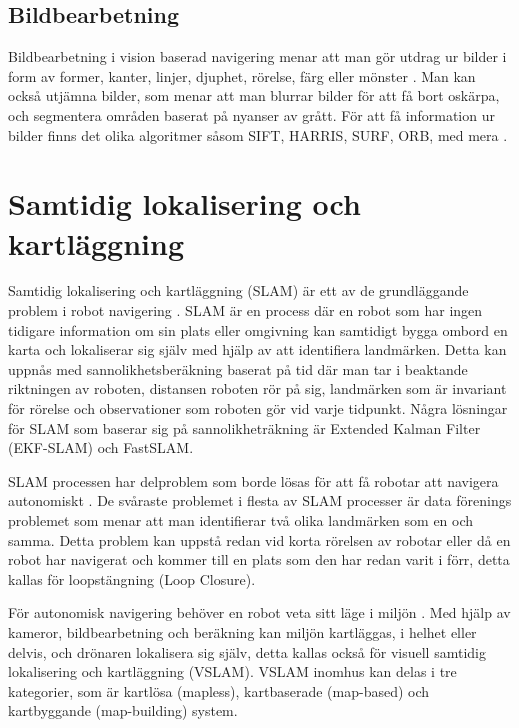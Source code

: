 \section{Bildbearbetning}

Bildbearbetning i vision baserad navigering menar att man gör utdrag ur bilder i form av former, kanter, linjer, djuphet, rörelse, färg eller mönster \citep{982903}. Man kan också utjämna bilder, som menar att man blurrar bilder för att få bort oskärpa, och segmentera områden baserat på nyanser av grått. För att få information ur bilder finns det olika algoritmer såsom SIFT, HARRIS, SURF, ORB, med mera \citep{8930783, slamproblem, mapbuildingsift}.

\chapter{Samtidig lokalisering och kartläggning}

Samtidig lokalisering och kartläggning (SLAM) är ett av de grundläggande problem i robot navigering \citep{realslamproblem}. SLAM är en process där en robot som har ingen tidigare information om sin plats eller omgivning kan samtidigt bygga ombord en karta och lokaliserar sig själv med hjälp av att identifiera landmärken. Detta kan uppnås med sannolikhetsberäkning baserat på tid där man tar i beaktande riktningen av roboten, distansen roboten rör på sig, landmärken som är invariant för rörelse och observationer som roboten gör vid varje tidpunkt. Några lösningar för SLAM som baserar sig på sannolikheträkning är Extended Kalman Filter (EKF-SLAM) och FastSLAM. 

SLAM processen har delproblem som borde lösas för att få robotar att navigera autonomiskt \citep{slamproblem}. De svåraste problemet i flesta av SLAM processer är data förenings problemet som menar att man identifierar två olika landmärken som en och samma. Detta problem kan uppstå redan vid korta rörelsen av robotar eller då en robot har navigerat och kommer till en plats som den har redan varit i förr, detta kallas för loopstängning (Loop Closure). 

För autonomisk navigering behöver en robot veta sitt läge i miljön \citep{geospatial}. Med hjälp av kameror, bildbearbetning och beräkning kan miljön kartläggas, i helhet eller delvis, och drönaren lokalisera sig själv, detta kallas också för visuell samtidig lokalisering och kartläggning (VSLAM). VSLAM inomhus kan delas i tre kategorier, som är kartlösa (mapless), kartbaserade (map-based) och kartbyggande (map-building) system. 

